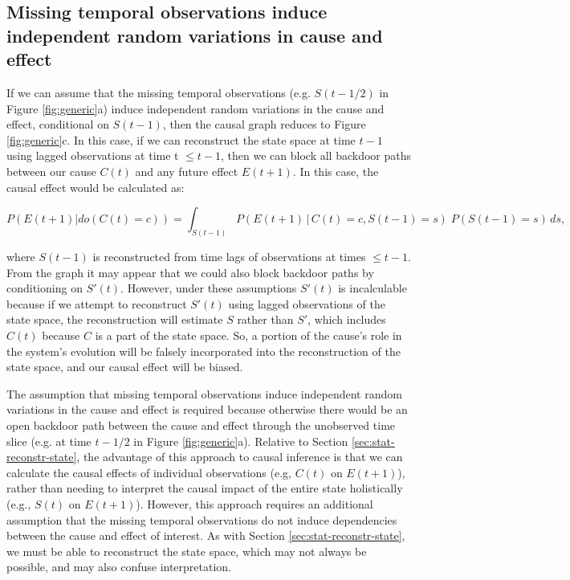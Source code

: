 \documentclass[12pt]{article}
\begin{document}
\subsection{Missing temporal observations induce independent random
  variations in cause and effect}
\label{sec:miss-temp-observ}

If we can assume that the missing temporal observations
(e.g. $S(t-1/2)$ in Figure \ref{fig:generic}a) induce independent
random variations in the cause and effect, conditional on $S(t-1)$,
then the causal graph reduces to Figure \ref{fig:generic}c. In this
case, if we can reconstruct the state space at time $t-1$ using lagged
observations at time t $\leq t-1$, then we can block all backdoor
paths between our cause $C(t)$ and any future effect $E(t+1)$. In this
case, the causal effect would be calculated as:

\begin{equation} P(E(t+1)| do(C(t)=c)) = \int_{S(t-1)} P(E(t+1) \, |
  \, C(t)=c, S(t-1) = s )\; P(S(t-1)=s) \, d s,
\end{equation}

where $S(t-1)$ is reconstructed from time lags of observations at
times $\leq t-1$. From the graph it may appear that we could also
block backdoor paths by conditioning on $S'(t)$. However, under these
assumptions $S'(t)$ is incalculable because if we attempt to
reconstruct $S'(t)$ using lagged observations of the state space, the
reconstruction will estimate $S$ rather than $S'$, which includes
$C(t)$ because $C$ is a part of the state space. So, a portion of the
cause's role in the system's evolution will be falsely incorporated
into the reconstruction of the state space, and our causal effect will
be biased.

The assumption that missing temporal observations induce independent
random variations in the cause and effect is required because
otherwise there would be an open backdoor path between the cause and
effect through the unobserved time slice (e.g. at time $t-1/2$ in
Figure \ref{fig:generic}a). Relative to Section
\ref{sec:stat-reconstr-state}, the advantage of this approach to
causal inference is that we can calculate the causal effects of
individual observations (e.g, $C(t)$ on $E(t+1)$), rather than needing
to interpret the causal impact of the entire state holistically (e.g.,
$S(t)$ on $E(t+1)$). However, this approach requires an additional
assumption that the missing temporal observations do not induce
dependencies between the cause and effect of interest. As with Section
\ref{sec:stat-reconstr-state}, we must be able to reconstruct the
state space, which may not always be possible, and may also confuse
interpretation.
\end{document}
